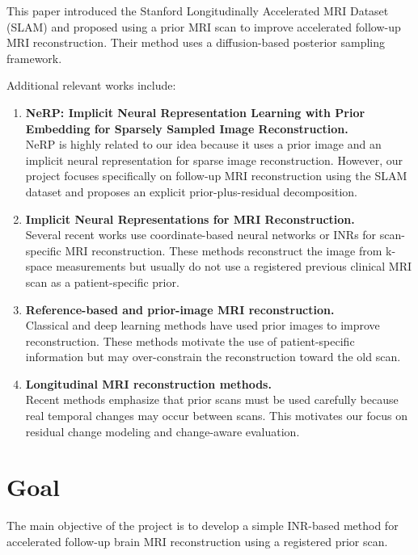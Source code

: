 \documentclass[11pt,a4paper]{article}
\begin{document}
This paper introduced the Stanford Longitudinally Accelerated MRI Dataset (SLAM) and proposed using a prior MRI scan to improve accelerated follow-up MRI reconstruction. Their method uses a diffusion-based posterior sampling framework.

Additional relevant works include:

\begin{enumerate}
    \item \textbf{NeRP: Implicit Neural Representation Learning with Prior Embedding for Sparsely Sampled Image Reconstruction.} \\
    NeRP is highly related to our idea because it uses a prior image and an implicit neural representation for sparse image reconstruction. However, our project focuses specifically on follow-up MRI reconstruction using the SLAM dataset and proposes an explicit prior-plus-residual decomposition.

    \item \textbf{Implicit Neural Representations for MRI Reconstruction.} \\
    Several recent works use coordinate-based neural networks or INRs for scan-specific MRI reconstruction. These methods reconstruct the image from k-space measurements but usually do not use a registered previous clinical MRI scan as a patient-specific prior.

    \item \textbf{Reference-based and prior-image MRI reconstruction.} \\
    Classical and deep learning methods have used prior images to improve reconstruction. These methods motivate the use of patient-specific information but may over-constrain the reconstruction toward the old scan.

    \item \textbf{Longitudinal MRI reconstruction methods.} \\
    Recent methods emphasize that prior scans must be used carefully because real temporal changes may occur between scans. This motivates our focus on residual change modeling and change-aware evaluation.
\end{enumerate}

\section{Goal}

The main objective of the project is to develop a simple INR-based method for accelerated follow-up brain MRI reconstruction using a registered prior scan.
\end{document}
